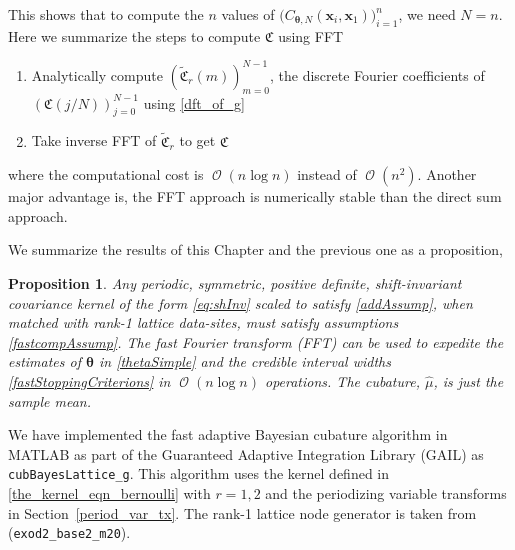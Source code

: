 \documentclass{iitthesis}          %
\DeclareMathOperator{\Order}{{\mathcal O}}
\newtheorem{prop}{Proposition}
\newcommand{\bm}[1]{\boldsymbol{#1}}
\newcommand{\vtheta}{{\bm{\theta}}}
\newcommand{\vx}{\bm{x}}
\newcommand{\hmu}{\widehat{\mu}}
\newcommand{\code}[1]{\texttt{#1}}
\newcommand\secref{Section~\ref}
\begin{document}
This shows that to compute the $n$ values of $\biggl( C_{\vtheta, N}(\vx_i, \vx_1) \biggr)_{i=1}^n$, we need $N=n$. Here we summarize the steps to compute $\mathfrak{C}$ using FFT
\begin{enumerate}
\item Analytically compute $\left(\widetilde{\mathfrak{C}}_{r}(m)\right)_{m=0}^{N-1}$, the discrete Fourier coefficients of $(\mathfrak{C}(j/N))_{j=0}^{N-1}$ using \eqref{dft_of_g}
\item Take inverse FFT of $\widetilde{\mathfrak{C}}_{r}$ to get $\mathfrak{C}$
\end{enumerate}
where the computational cost is $\Order(n \log n)$ instead of $\Order(n^2)$. Another major advantage is, the FFT approach is numerically stable than the direct sum approach.


We summarize the results of this Chapter and the previous one as a proposition,
\begin{prop}
Any periodic, symmetric, positive definite, shift-invariant covariance kernel of the form \eqref{eq:shInv} scaled to satisfy \eqref{addAssump}, when matched with rank-1 lattice data-sites, must satisfy assumptions \eqref{fastcompAssump}.  The \emph{fast Fourier transform} (FFT) can be used to expedite the estimates of $\vtheta$ in \eqref{thetaSimple} and the credible interval widths \eqref{fastStoppingCriterions} in $\Order(n \log n)$ operations. The cubature, $\hmu$, is just the sample mean.
\end{prop}

We have implemented the fast adaptive Bayesian cubature algorithm in MATLAB as part of the Guaranteed Adaptive Integration Library (GAIL) \cite{ChoEtal17b} as \allowbreak \\ \code{cubBayesLattice\_g}. This algorithm uses the kernel defined in  \eqref{the_kernel_eqn_bernoulli} with  $r=1,2$ and the periodizing variable transforms in \secref{period_var_tx}. The rank-1 lattice node generator is taken from \cite{NuyMagic} (\code{exod2\_base2\_m20}).












\label{period_var_tx}
\end{document}
